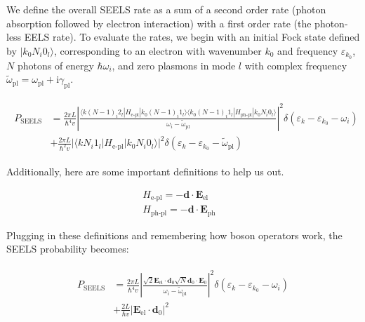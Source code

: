 \documentclass [11pt, proquest] {uwthesis}[2016/11/22]
\begin{document}
We define the overall SEELS rate as a sum of a second order rate (photon absorption followed by electron interaction) with a first order rate (the photon-less EELS rate). To evaluate the rates, we begin with an initial Fock state defined by $|k_0N_i0_l\rangle$, corresponding to an electron with wavenumber $k_0$ and frequency $\varepsilon_{k_0}$, $N$ photons of energy $\hbar\omega_i$, and zero plasmons in mode $l$ with complex frequency $\tilde{\omega}_{\textrm{pl}}=\omega_{\textrm{pl}}+\textrm{i}\gamma_{\textrm{pl}}$. 

\begin{align}
\begin{split}
  P_{\textrm{SEELS}} &= \frac{2\pi L}{\hbar^4v}\left|\frac{\langle k(N-1)_i2_l|H_{\textrm{e-pl}}|k_0(N-1)_i1_l\rangle\langle k_0(N-1)_i1_l|H_{\textrm{ph-pl}}|k_0N_i0_l\rangle}{\omega_i - \tilde{\omega}_{\textrm{pl}}}\right|^2\delta(\varepsilon_k - \varepsilon_{k_0}-\omega_i)\\
  &+ \frac{2\pi L}{\hbar^2v}|\langle kN_i1_l|H_{\textrm{e-pl}}|k_0N_i0_l\rangle|^2\delta(\varepsilon_k - \varepsilon_{k_0} - \tilde{\omega}_{\textrm{pl}})
  \label{overall_rate}
  \end{split}
\end{align}

Additionally, here are some important definitions to help us out.

\begin{equation}
\begin{aligned}
H_{\textrm{e-pl}} = -\textbf{d} \cdot \textbf{E}_{\textrm{el}}&\\
H_{\textrm{ph-pl}} = -\textbf{d} \cdot \textbf{E}_{\textrm{ph}}&
\end{aligned}
\end{equation}

Plugging in these definitions and remembering how boson operators work, the SEELS probability becomes:

\begin{align}
\begin{split}
  P_{\textrm{SEELS}} &= \frac{2\pi L}{\hbar^4v}\left|\frac{\sqrt{2}\textbf{E}_{\textrm{el}}\cdot\textbf{d}_0 \sqrt{N}\textbf{d}_0\cdot\textbf{E}_{0}}{\omega_i - \tilde{\omega}_{\textrm{pl}}}\right|^2\delta(\varepsilon_k - \varepsilon_{k_0}-\omega_i)\\
  &+ \frac{2L}{\hbar v}|\textbf{E}_{\textrm{el}}\cdot\textbf{d}_0|^2
  \label{change_eels}
  \end{split}
\end{align}
\end{document}
